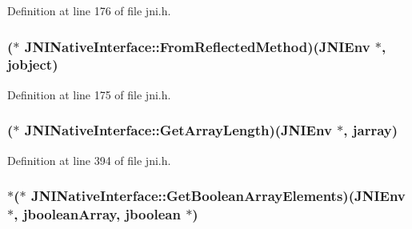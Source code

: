 Definition at line 176 of file jni.\-h.

\hypertarget{struct_j_n_i_native_interface_ae2e46bbc4361bcae036dd61e96fcba30}{
\subsubsection[{From\-Reflected\-Method}]{($\ast$ J\-N\-I\-Native\-Interface\-::\-From\-Reflected\-Method)({\bf J\-N\-I\-Env} $\ast$, {\bf jobject})}}\label{struct_j_n_i_native_interface_ae2e46bbc4361bcae036dd61e96fcba30}


Definition at line 175 of file jni.\-h.

\hypertarget{struct_j_n_i_native_interface_ab2a8cd2a34c3b1fc513598e7128a7c8e}{
\subsubsection[{Get\-Array\-Length}]{($\ast$ J\-N\-I\-Native\-Interface\-::\-Get\-Array\-Length)({\bf J\-N\-I\-Env} $\ast$, {\bf jarray})}}\label{struct_j_n_i_native_interface_ab2a8cd2a34c3b1fc513598e7128a7c8e}


Definition at line 394 of file jni.\-h.

\hypertarget{struct_j_n_i_native_interface_a2cc2e52fd4fa1522ce2d4de59e34ff71}{
\subsubsection[{Get\-Boolean\-Array\-Elements}]{$\ast$($\ast$ J\-N\-I\-Native\-Interface\-::\-Get\-Boolean\-Array\-Elements)({\bf J\-N\-I\-Env} $\ast$, {\bf jboolean\-Array}, {\bf jboolean} $\ast$)}}\label{struct_j_n_i_native_interface_a2cc2e52fd4fa1522ce2d4de59e34ff71}


